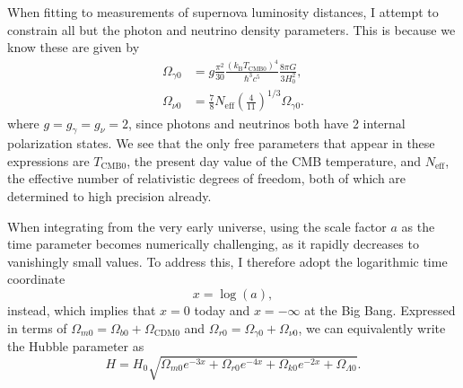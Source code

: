 \documentclass{aa}
\numberwithin{equation}{section}
\numberwithin{table}{section}
\numberwithin{figure}{section}
\begin{document}
When fitting to measurements of supernova luminosity distances, I attempt to constrain all but the photon and neutrino density parameters. This is because we know these are given by
\begin{align}
    \Omega_{\gamma0} &= g\frac{\pi^2}{30}\frac{\left(k_\text{B}T_{\text{CMB}0}\right)^4}{\hbar^3c^5}\frac{8\pi G}{3H_0^2},
    \\
    \Omega_{\nu0} &= \frac{7}{8}N_\text{eff}\left(\frac{4}{11}\right)^{1/3}\Omega_{\gamma0}.
\end{align}
where $g=g_\gamma=g_\nu=2$, since photons and neutrinos both have 2 internal polarization states. We see that the only free parameters that appear in these expressions are $T_{\text{CMB}0}$, the present day value of the CMB temperature, and $N_\text{eff}$, the effective number of relativistic degrees of freedom, both of which are determined to high precision already. 

When integrating from the very early universe, using the scale factor $a$ as the time parameter becomes numerically challenging, as it rapidly decreases to vanishingly small values. To address this, I therefore adopt the logarithmic time coordinate
\begin{equation}
    x = \log (a),
\end{equation}
instead, which implies that $x=0$ today and $x=-\infty$ at the Big Bang. Expressed in terms of $\Omega_{m0}=\Omega_{b0}+\Omega_{\text{CDM}0}$ and $\Omega_{r0}=\Omega_{\gamma0}+\Omega_{\nu0}$, we can equivalently write the Hubble parameter as
\begin{equation}
    H = H_0 \sqrt{\Omega_{m0} e^{-3x} + \Omega_{r0} e^{-4x} + \Omega_{k0} e^{-2x} + \Omega_{\Lambda 0}}.
\end{equation}
\end{document}
